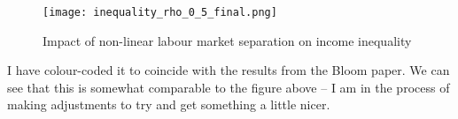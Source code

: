 \documentclass{article}
\begin{document}
		\begin{figure}[H]
		\centering
		\texttt{[image: inequality\_rho\_0\_5\_final.png]}
		\caption{Impact of non-linear labour market separation on income inequality}
	\end{figure}

	I have colour-coded it to coincide with the results from the Bloom paper. We can see that this is somewhat comparable to the figure above -- I am in the process of making adjustments to try and get something a little nicer.
	
\end{document}
